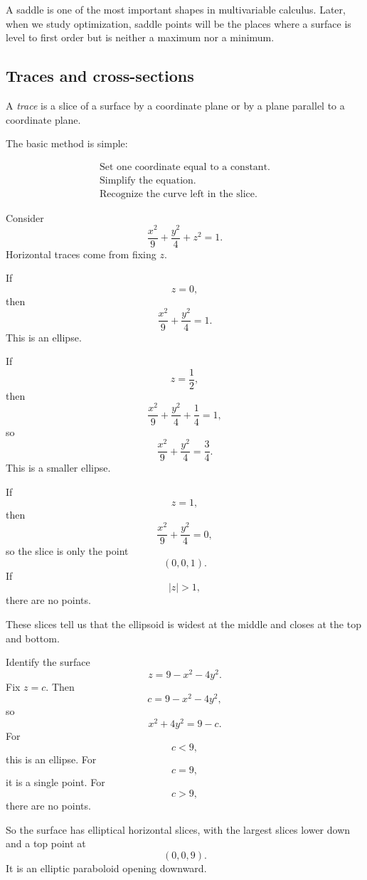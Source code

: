 A saddle is one of the most important shapes in multivariable calculus.  Later, when
we study optimization, saddle points will be the places where a surface is level to first
order but is neither a maximum nor a minimum.

\subsection{Traces and cross-sections}

A \emph{trace} is a slice of a surface by a coordinate plane or by a plane parallel to a
coordinate plane.

The basic method is simple:

\[
\begin{array}{l}
\text{Set one coordinate equal to a constant.}\\
\text{Simplify the equation.}\\
\text{Recognize the curve left in the slice.}
\end{array}
\]

\begin{example}
Consider
\[
    \frac{x^2}{9}+\frac{y^2}{4}+z^2=1.
\]
Horizontal traces come from fixing \(z\).

If
\[
    z=0,
\]
then
\[
    \frac{x^2}{9}+\frac{y^2}{4}=1.
\]
This is an ellipse.

If
\[
    z=\frac12,
\]
then
\[
    \frac{x^2}{9}+\frac{y^2}{4}+\frac14=1,
\]
so
\[
    \frac{x^2}{9}+\frac{y^2}{4}=\frac34.
\]
This is a smaller ellipse.

If
\[
    z=1,
\]
then
\[
    \frac{x^2}{9}+\frac{y^2}{4}=0,
\]
so the slice is only the point
\[
    (0,0,1).
\]
If
\[
    |z|>1,
\]
there are no points.

These slices tell us that the ellipsoid is widest at the middle and closes at the top and
bottom.
\end{example}

\begin{example}
Identify the surface
\[
    z=9-x^2-4y^2.
\]
Fix \(z=c\).  Then
\[
    c=9-x^2-4y^2,
\]
so
\[
    x^2+4y^2=9-c.
\]
For
\[
    c<9,
\]
this is an ellipse.  For
\[
    c=9,
\]
it is a single point.  For
\[
    c>9,
\]
there are no points.

So the surface has elliptical horizontal slices, with the largest slices lower down and
a top point at
\[
    (0,0,9).
\]
It is an elliptic paraboloid opening downward.
\end{example}

